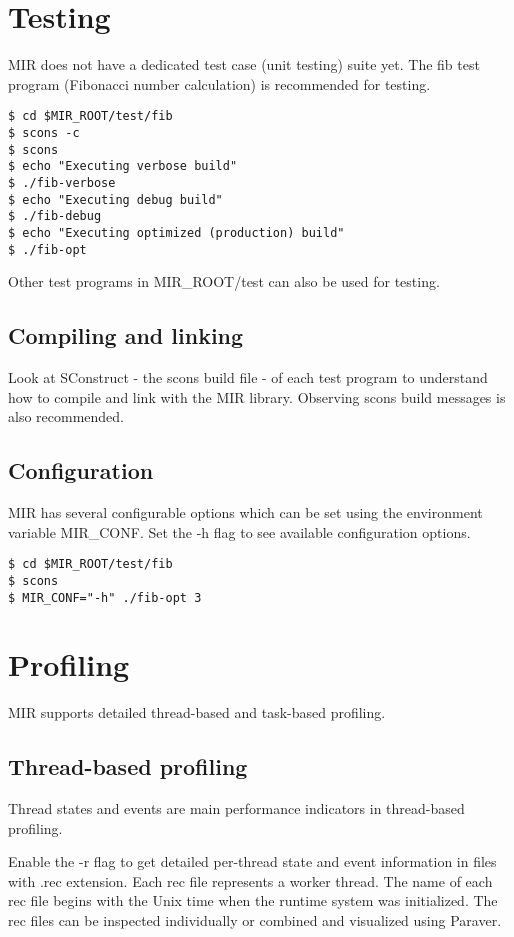\documentclass[11pt,a4paper,notitlepage]{article}
\begin{document}
\section{Testing}
MIR does not have a dedicated test case (unit testing) suite yet. The fib test program (Fibonacci number calculation) is recommended for testing.

\begin{lstlisting}[style=BashInputStyle]
$ cd $MIR_ROOT/test/fib
$ scons -c
$ scons
$ echo "Executing verbose build"
$ ./fib-verbose
$ echo "Executing debug build"
$ ./fib-debug
$ echo "Executing optimized (production) build"
$ ./fib-opt
\end{lstlisting}

Other test programs in MIR\_ROOT/test can also be used for testing.

\subsection{Compiling and linking}
Look at SConstruct - the scons build file - of each test program to understand how to compile and link with the MIR library. Observing scons build messages is also recommended.

\subsection{Configuration}
MIR has several configurable options which can be set using the environment variable MIR\_CONF. Set the -h flag to see available configuration options.

\begin{lstlisting}[style=BashInputStyle]
$ cd $MIR_ROOT/test/fib
$ scons 
$ MIR_CONF="-h" ./fib-opt 3
\end{lstlisting}

\section{Profiling}
MIR supports detailed thread-based and task-based profiling.

\subsection{Thread-based profiling}
Thread states and events are main performance indicators in thread-based profiling. 

Enable the -r flag to get detailed per-thread state and event information in files with .rec extension.
Each rec file represents a worker thread.
The name of each rec file begins with the Unix time when the runtime system was initialized.
The rec files can be inspected individually or combined and visualized using Paraver.
\end{document}
